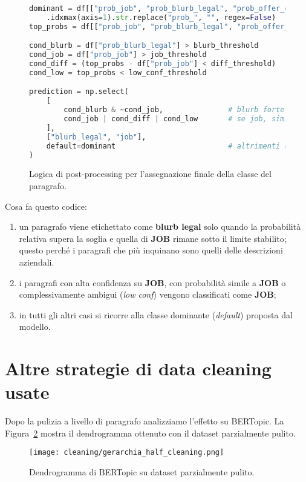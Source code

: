 \begin{figure}[H]
    \centering
    \scriptsize
\begin{lstlisting}[language=python]
dominant = df[["prob_job", "prob_blurb_legal", "prob_offer_detail"]] \
    .idxmax(axis=1).str.replace("prob_", "", regex=False)
top_probs = df[["prob_job", "prob_blurb_legal", "prob_offer_detail"]].max(axis=1)

cond_blurb = df["prob_blurb_legal"] > blurb_threshold
cond_job = df["prob_job"] > job_threshold
cond_diff = (top_probs - df["prob_job"] < diff_threshold)
cond_low = top_probs < low_conf_threshold

prediction = np.select(
    [
        cond_blurb & ~cond_job,               # blurb forte e non job
        cond_job | cond_diff | cond_low       # se job, simile a job, o incerto
    ],
    ["blurb_legal", "job"],
    default=dominant                          # altrimenti usa la classe dominante
)
\end{lstlisting}
    \caption{Logica di post-processing per l'assegnazione finale della classe del paragrafo.}
    \label{fig:lr-postprocess}
\end{figure}

\noindent Cosa fa questo codice:
\begin{enumerate}
    \item un paragrafo viene etichettato come \textbf{blurb legal} solo quando la probabilità relativa supera la soglia e quella di \textbf{JOB} rimane sotto il limite stabilito; questo perché i paragrafi che più inquinano sono quelli delle descrizioni aziendali.
    \item i paragrafi con alta confidenza su \textbf{JOB}, con probabilità simile a \textbf{JOB} o complessivamente ambigui (\textit{low conf}) vengono classificati come \textbf{JOB};
    \item in tutti gli altri casi si ricorre alla classe dominante (\textit{default}) proposta dal modello.
\end{enumerate}
\section{Altre strategie di data cleaning usate}

\noindent Dopo la pulizia a livello di paragrafo analizziamo l'effetto su BERTopic. La Figura~\ref{fig:half-cleaning} mostra il dendrogramma ottenuto con il dataset parzialmente pulito.

\begin{figure}[H]
    \centering
    \texttt{[image: cleaning/gerarchia\_half\_cleaning.png]}
    \caption{Dendrogramma di BERTopic su dataset parzialmente pulito.}
    \label{fig:half-cleaning}
\end{figure}

